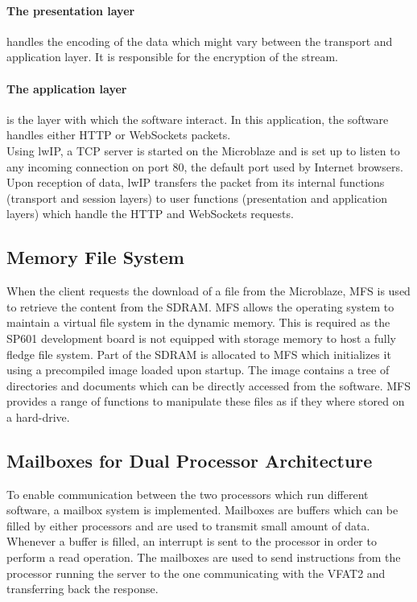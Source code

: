       \paragraph{The presentation layer} handles the encoding of the data which might vary between the transport and application layer. It is responsible for the encryption of the stream.

      \paragraph{The application layer} is the layer with which the software interact. In this application, the software handles either HTTP or WebSockets packets. \\

      Using lwIP, a TCP server is started on the Microblaze and is set up to listen to any incoming connection on port 80, the default port used by Internet browsers. Upon reception of data, lwIP transfers the packet from its internal functions (transport and session layers) to user functions (presentation and application layers) which handle the HTTP and WebSockets requests.

    \subsection{Memory File System}

      When the client requests the download of a file from the Microblaze, MFS is used to retrieve the content from the SDRAM. MFS allows the operating system to maintain a virtual file system in the dynamic memory. This is required as the SP601 development board is not equipped with storage memory to host a fully fledge file system. Part of the SDRAM is allocated to MFS which initializes it using a precompiled image loaded upon startup. The image contains a tree of directories and documents which can be directly accessed from the software. MFS provides a range of functions to manipulate these files as if they where stored on a hard-drive.

    \subsection{Mailboxes for Dual Processor Architecture}

      To enable communication between the two processors which run different software, a mailbox system is implemented. Mailboxes are buffers which can be filled by either processors and are used to transmit small amount of data. Whenever a buffer is filled, an interrupt is sent to the processor in order to perform a read operation. The mailboxes are used to send instructions from the processor running the server to the one communicating with the VFAT2 and transferring back the response. \\

